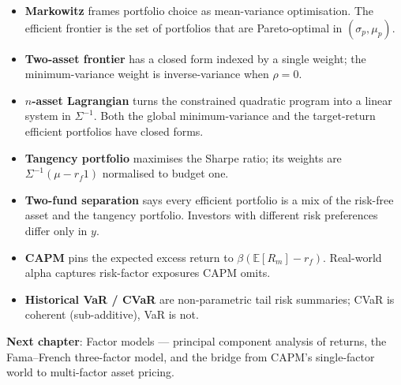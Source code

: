 \begin{itemize}
    \item \textbf{Markowitz} frames portfolio choice as mean-variance
      optimisation. The efficient frontier is the set of portfolios that
      are Pareto-optimal in $(\sigma_p, \mu_p)$.
    \item \textbf{Two-asset frontier} has a closed form indexed by a single
      weight; the minimum-variance weight is inverse-variance when
      $\rho = 0$.
    \item \textbf{$n$-asset Lagrangian} turns the constrained quadratic
      program into a linear system in $\Sigma^{-1}$. Both the global
      minimum-variance and the target-return efficient portfolios have
      closed forms.
    \item \textbf{Tangency portfolio} maximises the Sharpe ratio; its
      weights are $\Sigma^{-1} (\mu - r_f 1)$ normalised to budget one.
    \item \textbf{Two-fund separation} says every efficient portfolio is a
      mix of the risk-free asset and the tangency portfolio. Investors
      with different risk preferences differ only in $y$.
    \item \textbf{CAPM} pins the expected excess return to
      $\beta (\mathbb{E}[R_m] - r_f)$. Real-world alpha captures
      risk-factor exposures CAPM omits.
    \item \textbf{Historical VaR / CVaR} are non-parametric tail risk
      summaries; CVaR is coherent (sub-additive), VaR is not.
\end{itemize}

\vspace{1em}
\noindent\textbf{Next chapter}: Factor models --- principal component
analysis of returns, the Fama--French three-factor model, and the bridge
from CAPM's single-factor world to multi-factor asset pricing.